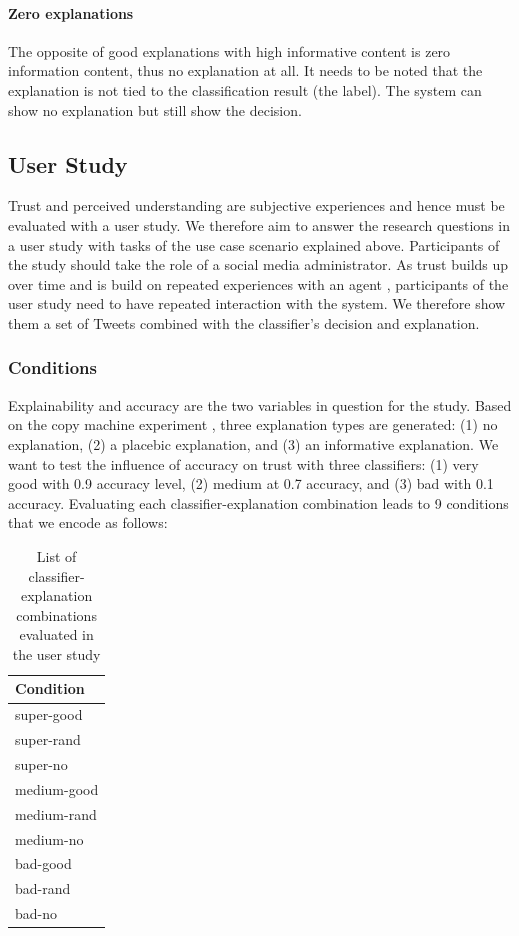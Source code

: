 \paragraph{Zero explanations}
The opposite of good explanations with high informative content is zero information content, thus no explanation at all. It needs to be noted that the explanation is not tied to the classification result (the label). The system can show no explanation but still show the decision. 



\subsection{User Study}
Trust and perceived understanding are subjective experiences and hence must be evaluated with a user study. We therefore aim to answer the research questions in a user study with tasks of the use case scenario explained above. Participants of the study should take the role of a social media administrator. As trust builds up over time and is build on repeated experiences with an agent \cite{rempel1985trust}, participants of the user study need to have repeated interaction with the system. We therefore show them a set of Tweets combined with the classifier's decision and explanation.\newline

\subsubsection{Conditions}
Explainability and accuracy are the two variables in question for the study. Based on the copy machine experiment \cite{langer1978mindlessness}, three explanation types are generated: (1) no explanation, (2) a placebic explanation, and (3) an informative explanation. We want to test the influence of accuracy on trust with three classifiers: (1) very good with 0.9 accuracy level, (2) medium at 0.7 accuracy, and (3) bad with 0.1 accuracy. Evaluating each classifier-explanation combination leads to 9 conditions that we encode as follows:
\begin{table}[H]
	\centering
	\begin{tabular}{l}
		\textbf{Condition}\\ \midrule
		super-good\\
		super-rand\\
		super-no\\
		medium-good\\
		medium-rand\\
		medium-no\\
		bad-good\\
		bad-rand\\
		bad-no\\ \bottomrule
	\end{tabular}
	\caption{List of classifier-explanation combinations evaluated in the user study}
	\label{tab:conditions}
\end{table} 


